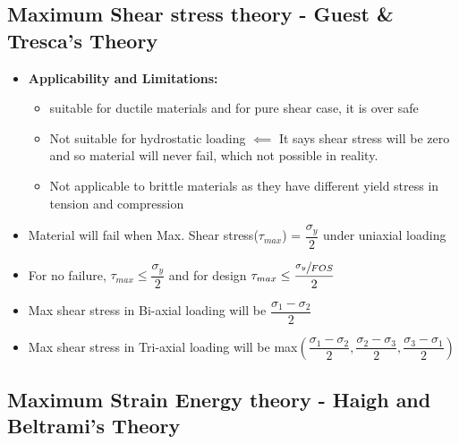 \documentclass[8pt]{report}
\begin{document}
		\subsection{Maximum Shear stress theory - Guest \& Tresca's Theory}
			\begin{itemize}
				\item \textbf{Applicability and Limitations:}
				\begin{itemize}
					\item suitable for ductile materials and for pure shear case, it is over safe
					\item Not suitable for hydrostatic loading $\impliedby$ It says shear stress will be zero and so material will never fail, which not possible in reality.
					\item Not applicable to brittle materials as they have different yield stress in tension and compression
				\end{itemize}
				\item Material will fail when Max. Shear stress($\tau_{max}$) = $\dfrac{\sigma_y}{2}$ under uniaxial loading
				\item For no failure, $\tau_{max}\le\dfrac{\sigma_y}{2}$ and for design $\tau_{max}\le\dfrac{\sfrac{\sigma_y}{FOS}}{2}$
				\item Max shear stress in Bi-axial loading will be $\dfrac{\sigma_1-\sigma_2}{2}$
				\item Max shear stress in Tri-axial loading will be max$\left(\dfrac{\sigma_1-\sigma_2}{2},\dfrac{\sigma_2-\sigma_3}{2},\dfrac{\sigma_3-\sigma_1}{2}\right)$
			\end{itemize}\hrulefill
		\subsection{Maximum Strain Energy theory - Haigh and Beltrami's Theory}
									
\end{document}
